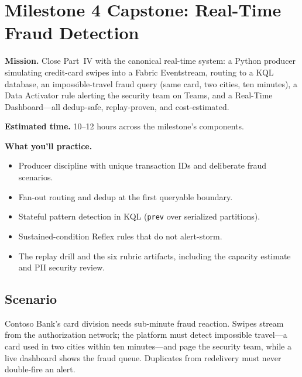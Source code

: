 \section{Milestone 4 Capstone: Real-Time Fraud Detection}\label{sec:ch16-capstone}

\begin{capstonebox}
\textbf{Mission.} Close Part~IV with the canonical real-time system: a Python producer simulating credit-card swipes into a Fabric Eventstream, routing to a KQL database, an impossible-travel fraud query (same card, two cities, ten minutes), a Data Activator rule alerting the security team on Teams, and a Real-Time Dashboard---all dedup-safe, replay-proven, and cost-estimated.

\textbf{Estimated time.} 10--12 hours across the milestone's components.

\textbf{What you'll practice.}
\begin{itemize}
    \item Producer discipline with unique transaction IDs and deliberate fraud scenarios.
    \item Fan-out routing and dedup at the first queryable boundary.
    \item Stateful pattern detection in KQL (\texttt{prev} over serialized partitions).
    \item Sustained-condition Reflex rules that do not alert-storm.
    \item The replay drill and the six rubric artifacts, including the capacity estimate and PII security review.
\end{itemize}
\end{capstonebox}

\subsection*{Scenario}
Contoso Bank's card division needs sub-minute fraud reaction. Swipes stream from the authorization network; the platform must detect impossible travel---a card used in two cities within ten minutes---and page the security team, while a live dashboard shows the fraud queue. Duplicates from redelivery must never double-fire an alert.

